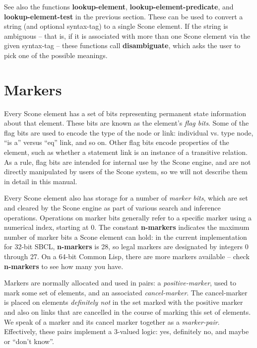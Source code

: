 \documentclass[titlepage,twoside,openright,11pt]{article}
\begin{document}
See also the functions \textbf{lookup-element},
\textbf{lookup-element-predicate}, and \textbf{lookup-element-test} in
the previous section. These can be used to convert a string (and
optional syntax-tag) to a single Scone element. If the string is
ambiguous -- that is, if it is associated with more than one Scone
element via the given syntax-tag -- these functions call
\textbf{disambiguate}, which asks the user to pick one of the possible
meanings.

\section{\texorpdfstring{Markers }{Markers }}\label{markers}

Every Scone element has a set of bits representing permanent state
information about that element. These bits are known as the element's
\emph{flag bits}. Some of the flag bits are used to encode the type of
the node or link: individual vs. type node, ``is a'' versus ``eq'' link,
and so on. Other flag bits encode properties of the element, such as
whether a statement link is an instance of a transitive relation. As a
rule, flag bits are intended for internal use by the Scone engine, and
are not directly manipulated by users of the Scone system, so we will
not describe them in detail in this manual.

Every Scone element also has storage for a number of \emph{marker bits},
which are set and cleared by the Scone engine as part of various search
and inference operations. Operations on marker bits generally refer to a
specific marker using a numerical index, starting at 0. The constant
\textbf{n-markers} indicates the maximum number of marker bits a Scone
element can hold: in the current implementation for 32-bit SBCL,
\textbf{n-markers} is 28, so legal markers are designated by integers 0
through 27. On a 64-bit Common Lisp, there are more markers available --
check \textbf{n-markers} to see how many you have.

Markers are normally allocated and used in pairs: a
\emph{positive-marker}, used to mark some set of elements, and an
associated \emph{cancel-marker}. The cancel-marker is placed on elements
\emph{definitely not} in the set marked with the positive marker and
also on links that are cancelled in the course of marking this set of
elements. We speak of a marker and its cancel marker together as a
\emph{marker-pair}. Effectively, these pairs implement a 3-valued logic:
yes, definitely no, and maybe or ``don't know''.
\end{document}
